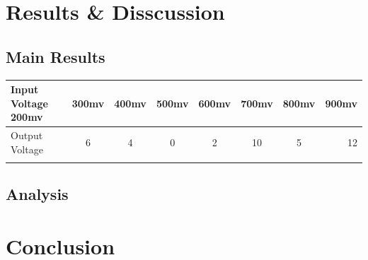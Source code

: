 \documentclass[12pt]{article}
\begin{document}
\section{Results \& Disscussion}


\subsection{Main Results}

\begin{tabular}{l*{6}{c}r}
Input Voltage    200mv & 300mv & 400mv & 500mv & 600mv & 700mv & 800mv & 900mv \\
\hline
Output Voltage   & 6 & 4 & 0 & 2 & 10 & 5 & 12  \\
\\

\end{tabular}


\subsection{Analysis}


\section{Conclusion}





\pagebreak
\inputminted[breaklines]{tex}{main.tex}
\end{document}
